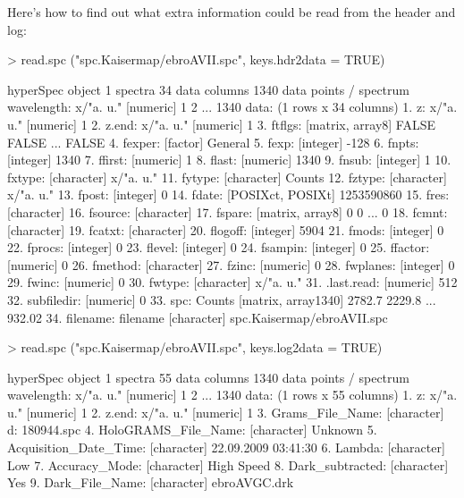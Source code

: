 \documentclass[english, a4paper, 10pt, headings=small, DIV11]{scrartcl}
\renewenvironment{Schunk}{\vspace{0pt}\begin{small}}{\end{small}\vspace{0pt}}
\begin{document}
Here's how to find out what extra information could be read from the header and log:

\begin{Schunk}
\begin{Sinput}
> read.spc ("spc.Kaisermap/ebroAVII.spc", keys.hdr2data = TRUE)
\end{Sinput}
\begin{Soutput}
hyperSpec object
   1 spectra
   34 data columns
   1340 data points / spectrum
wavelength: x/"a. u." [numeric] 1 2 ... 1340 
data:  (1 rows x 34 columns)
   1. z: x/"a. u." [numeric] 1 
   2. z.end: x/"a. u." [numeric] 1 
   3. ftflgs:  [matrix, array8] FALSE FALSE ... FALSE 
   4. fexper:  [factor] General 
   5. fexp:  [integer] -128 
   6. fnpts:  [integer] 1340 
   7. ffirst:  [numeric] 1 
   8. flast:  [numeric] 1340 
   9. fnsub:  [integer] 1 
   10. fxtype:  [character] x/"a. u." 
   11. fytype:  [character] Counts 
   12. fztype:  [character] x/"a. u." 
   13. fpost:  [integer] 0 
   14. fdate:  [POSIXct, POSIXt] 1253590860 
   15. fres:  [character]  
   16. fsource:  [character]  
   17. fspare:  [matrix, array8] 0 0 ... 0 
   18. fcmnt:  [character]  
   19. fcatxt:  [character]  
   20. flogoff:  [integer] 5904 
   21. fmods:  [integer] 0 
   22. fprocs:  [integer] 0 
   23. flevel:  [integer] 0 
   24. fsampin:  [integer] 0 
   25. ffactor:  [numeric] 0 
   26. fmethod:  [character]  
   27. fzinc:  [numeric] 0 
   28. fwplanes:  [integer] 0 
   29. fwinc:  [numeric] 0 
   30. fwtype:  [character] x/"a. u." 
   31. .last.read:  [numeric] 512 
   32. subfiledir:  [numeric] 0 
   33. spc: Counts [matrix, array1340] 2782.7 2229.8 ... 932.02 
   34. filename: filename [character] spc.Kaisermap/ebroAVII.spc 
\end{Soutput}
\begin{Sinput}
> read.spc ("spc.Kaisermap/ebroAVII.spc", keys.log2data = TRUE)
\end{Sinput}
\begin{Soutput}
hyperSpec object
   1 spectra
   55 data columns
   1340 data points / spectrum
wavelength: x/"a. u." [numeric] 1 2 ... 1340 
data:  (1 rows x 55 columns)
   1. z: x/"a. u." [numeric] 1 
   2. z.end: x/"a. u." [numeric] 1 
   3. Grams_File_Name:  [character] d:\beleites\ebro{} 180944\ebroAVII.spc 
   4. HoloGRAMS_File_Name:  [character] Unknown 
   5. Acquisition_Date_Time:  [character] 22.09.2009 03:41:30 
   6. Lambda:  [character] Low 
   7. Accuracy_Mode:  [character] High Speed 
   8. Dark_subtracted:  [character] Yes 
   9. Dark_File_Name:  [character] ebroAVGC.drk 

\end{Soutput}
\end{Schunk}
\end{document}
